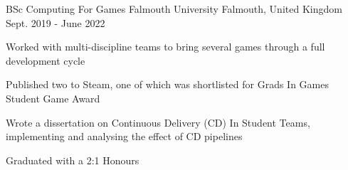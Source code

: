 \begin{cventries}
  \cventry
    {BSc Computing For Games} %
    {Falmouth University} %
    {Falmouth, United Kingdom} %
    {Sept. 2019 - June 2022} %
    {
      \begin{cvitems} %
        \item Worked with multi-discipline teams to bring several games through a full development cycle
        \item Published two to Steam, one of which was shortlisted for Grads In Games Student Game Award
        \item Wrote a dissertation on Continuous Delivery (CD) In Student Teams, implementing and analysing the effect of CD pipelines
        \item Graduated with a 2:1 Honours
      \end{cvitems}
    }
\end{cventries}